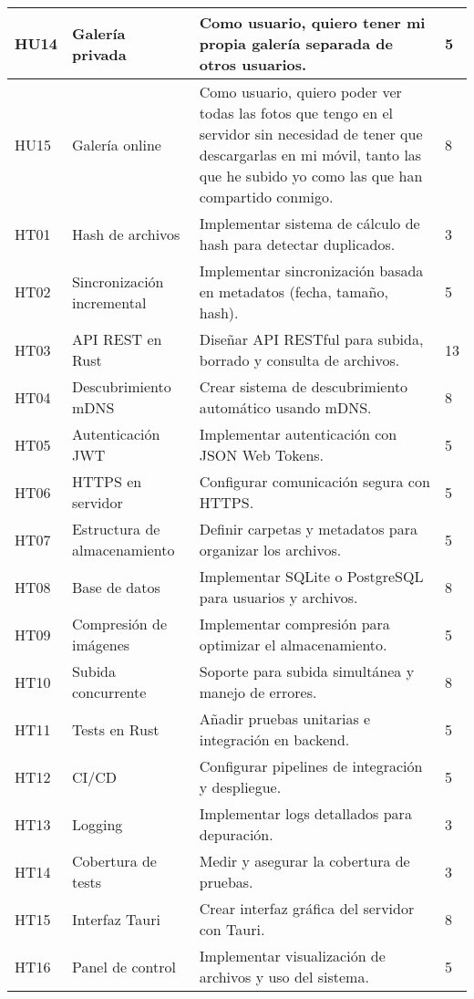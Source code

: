 \begin{tabularx}{\textwidth}{|l|l|>{\raggedright\arraybackslash}X|p{2cm}|}
    \hline
    HU14 & Galería privada & Como usuario, quiero tener mi propia galería separada de otros usuarios. & 5 \\
    \hline
    HU15 & Galería online & Como usuario, quiero poder ver todas las fotos que tengo en el servidor sin necesidad de tener que descargarlas en mi móvil, tanto las que he subido yo como las que han compartido conmigo. & 8 \\
    \hline
    HT01 & Hash de archivos & Implementar sistema de cálculo de hash para detectar duplicados. & 3 \\
    \hline
    HT02 & Sincronización incremental & Implementar sincronización basada en metadatos (fecha, tamaño, hash). & 5 \\
    \hline
    HT03 & API REST en Rust & Diseñar API RESTful para subida, borrado y consulta de archivos. & 13 \\
    \hline
    HT04 & Descubrimiento mDNS & Crear sistema de descubrimiento automático usando mDNS. & 8 \\
    \hline
    HT05 & Autenticación JWT & Implementar autenticación con JSON Web Tokens. & 5 \\
    \hline
    HT06 & HTTPS en servidor & Configurar comunicación segura con HTTPS. & 5 \\
    \hline
    HT07 & Estructura de almacenamiento & Definir carpetas y metadatos para organizar los archivos. & 5 \\
    \hline
    HT08 & Base de datos & Implementar SQLite o PostgreSQL para usuarios y archivos. & 8 \\
    \hline
    HT09 & Compresión de imágenes & Implementar compresión para optimizar el almacenamiento. & 5 \\
    \hline
    HT10 & Subida concurrente & Soporte para subida simultánea y manejo de errores. & 8 \\
    \hline
    HT11 & Tests en Rust & Añadir pruebas unitarias e integración en backend. & 5 \\
    \hline
    HT12 & CI/CD & Configurar pipelines de integración y despliegue. & 5 \\
    \hline
    HT13 & Logging & Implementar logs detallados para depuración. & 3 \\
    \hline
    HT14 & Cobertura de tests & Medir y asegurar la cobertura de pruebas. & 3 \\
    \hline
    HT15 & Interfaz Tauri & Crear interfaz gráfica del servidor con Tauri. & 8 \\
    \hline
    HT16 & Panel de control & Implementar visualización de archivos y uso del sistema. & 5 \\

\end{tabularx}
